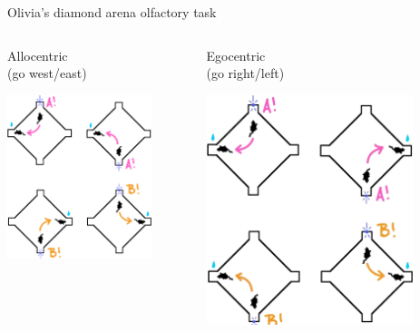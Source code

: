 \documentclass[bigger]{beamer}
\begin{document}
\begin{frame}[label={sec:org047aefd}]{Olivia's diamond arena olfactory task}
\begin{columns}
\begin{column}[t]{0.5\columnwidth}
\center
Allocentric\\
(go west/east)
\begin{center}
\includegraphics[width=0.8\textwidth]{img/allocentric-task.png}
\end{center}
\end{column}

\begin{column}[t]{0.5\columnwidth}
\center
Egocentric\\
(go right/left)
\begin{center}
\includegraphics[width=0.8\textwidth]{img/egocentric-task.png}
\end{center}


\end{column}
\end{columns}
\end{frame}
\end{document}
